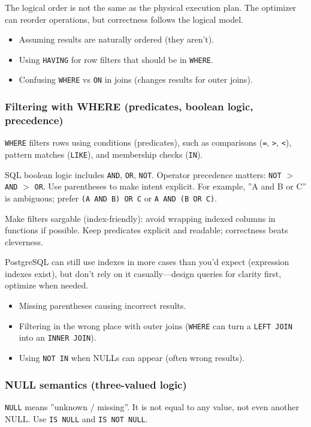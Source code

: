 \E The logical order is not the same as the physical execution plan. The optimizer can reorder 
operations, but correctness follows the logical model.

\Pitfall
\begin{itemize}
  \item Assuming results are naturally ordered (they aren't).
  \item Using \texttt{HAVING} for row filters that should be in \texttt{WHERE}.
  \item Confusing \texttt{WHERE} vs \texttt{ON} in joins (changes results for outer joins).
\end{itemize}

\subsubsection{Filtering with WHERE (predicates, boolean logic, precedence)}
\J \texttt{WHERE} filters rows using conditions (predicates), such as comparisons (\texttt{=}, 
\texttt{>}, \texttt{<}), pattern matches (\texttt{LIKE}), and membership checks (\texttt{IN}).

\M SQL boolean logic includes \texttt{AND}, \texttt{OR}, \texttt{NOT}. Operator precedence 
matters: \texttt{NOT} $>$ \texttt{AND} $>$ \texttt{OR}. Use parentheses to make intent explicit. 
For example, ''A and B or C'' is ambiguous; prefer \texttt{(A AND B) OR C} or \texttt{A AND (B OR C)}.

\Sx Make filters sargable (index-friendly): avoid wrapping indexed columns in functions if possible. 
Keep predicates explicit and readable; correctness beats cleverness.

\E PostgreSQL can still use indexes in more cases than you'd expect (expression indexes exist), 
but don't rely on it casually—design queries for clarity first, optimize when needed.

\Pitfall
\begin{itemize}
  \item Missing parentheses causing incorrect results.
  \item Filtering in the wrong place with outer joins (\texttt{WHERE} can turn a 
  \texttt{LEFT JOIN} into an \texttt{INNER JOIN}).
  \item Using \texttt{NOT IN} when NULLs can appear (often wrong results).
\end{itemize}

\subsubsection{NULL semantics (three-valued logic)}
\J \texttt{NULL} means ''unknown / missing''. It is not equal to any value, not even another NULL. 
Use \texttt{IS NULL} and \texttt{IS NOT NULL}.

